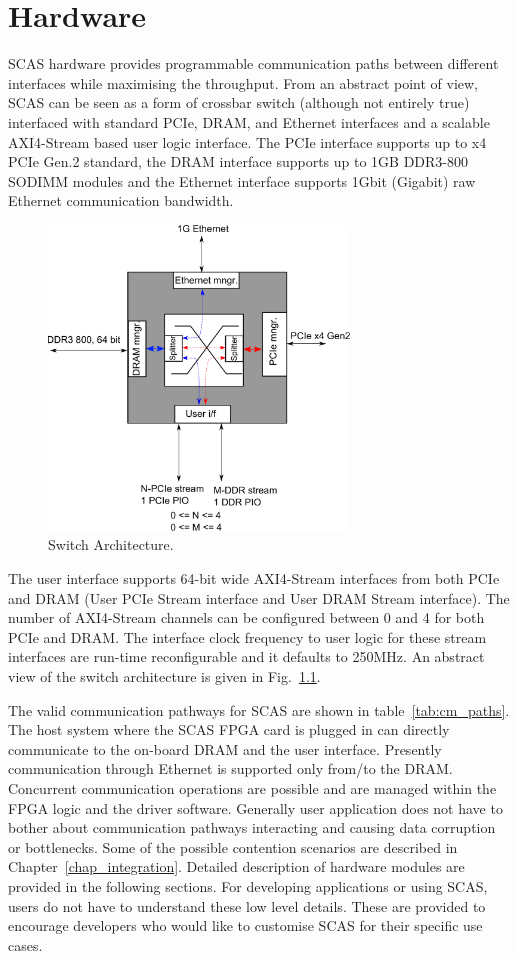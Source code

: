 \chapter{Hardware}
\label{chap_hardware}

SCAS hardware provides programmable communication paths between different interfaces while maximising the throughput.
From an abstract point of view, SCAS can be seen as a form of crossbar switch (although not entirely true) interfaced with standard PCIe, DRAM, and Ethernet interfaces and a scalable AXI4-Stream based user logic interface.
The PCIe interface supports up to x4 PCIe Gen.2 standard, the DRAM interface supports up to 1GB DDR3-800 SODIMM modules and the Ethernet interface supports 1Gbit (Gigabit) raw Ethernet communication bandwidth.

\begin{figure}[h]
\centering
\includegraphics[width=8cm]{figures/switch.pdf}
\caption{Switch Architecture.}
\label{fig:switch_arch}
\end{figure}

\noindent The user interface supports 64-bit wide AXI4-Stream interfaces from both PCIe and DRAM (User PCIe Stream interface and User DRAM Stream interface).
The number of AXI4-Stream channels can be configured between 0 and 4 for both PCIe and DRAM.
The interface clock frequency to user logic for these stream interfaces are run-time reconfigurable and it defaults to 250MHz.
An abstract view of the switch architecture is given in Fig.~\ref{fig:switch_arch}.

The valid communication pathways for SCAS are shown in table~\ref{tab:cm_paths}.
The host system where the SCAS FPGA card is plugged in can directly communicate to the on-board DRAM and the user interface.
Presently communication through Ethernet is supported only from/to the DRAM.
Concurrent communication operations are possible and are managed within the FPGA logic and the driver software.
Generally user application does not have to bother about communication pathways interacting and causing data corruption or bottlenecks.
Some of the possible contention scenarios are described in Chapter~\ref{chap_integration}.
Detailed description of hardware modules are provided in the following sections.
For developing applications or using SCAS, users do not have to understand these low level details.
These are provided to encourage developers who would like to customise SCAS for their specific use cases.

